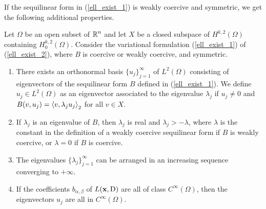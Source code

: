 If the sequilinear form in (\ref{ell_exist_1}) is weakly coercive and
symmetric, we get the following additional properties.

\begin{theorem} \label{ell_exist_th3}
Let $\Omega$ be an open subset of $\displaystyle \mathbb{R}^n$ and let $X$ be a closed
subspace of $\displaystyle H^{k,2}(\Omega)$ containing
$\displaystyle H^{k,2}_0(\Omega)$.
Consider the variational formulation (\ref{ell_exist_1}) of
(\ref{ell_exist_2}), where $B$ is coercive or weakly coercive, and symmetric.
\begin{enumerate}
\item There exists an orthonormal basis $\displaystyle \{u_j\}_{j=1}^\infty$ of
$\displaystyle L^2(\Omega)$ consisting of eigenvectors of the sequilinear form
$B$ defined in (\ref{ell_exist_1}).  We define
$\displaystyle u_j \in L^2(\Omega)$ as
an eigenvector associated to the eigenvalue $\lambda_j$ if $u_j\neq 0$
and $B(v,u_j)= \left\langle{v} , {\lambda_j u_j}\right\rangle_2$ for all $v\in X$.
\item If $\lambda_j$ is an eigenvalue of $B$, then $\lambda_j$ is real
and $\lambda_j > -\lambda$, where $\lambda$ is the constant in the
definition of a weakly coercive sequilinear form if $B$ is weakly
coercive, or $\lambda =0$ if $B$ is coercive.
\item The eigenvalues $\displaystyle \{\lambda_j\}_{j=1}^\infty$ can
be arranged in an increasing sequence converging to $+\infty$.
\item If the coefficients $b_{\alpha,\beta}$ of $L(\mathbf{x},\operatorname{D})$ are
all of class $\displaystyle C^\infty(\Omega)$, then the eigenvectors
$u_j$ are all in $\displaystyle C^\infty(\Omega)$.
\end{enumerate}
\end{theorem}

